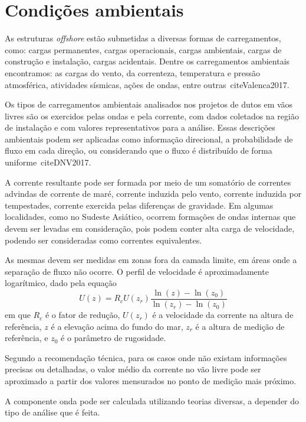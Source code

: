 \section{Condições ambientais}
\label{sec:condicoes-ambientais}

As estruturas \textit{offshore} estão submetidas a diversas formas de carregamentos, como: cargas permanentes, cargas operacionais, cargas ambientais, cargas de construção e instalação, cargas acidentais.
Dentre os carregamentos ambientais encontramos: as cargas do vento, da correnteza, temperatura e pressão atmosférica, atividades sísmicas, ações de ondas, entre outras~cite{Valenca2017}.

Os tipos de carregamentos ambientais analisados nos projetos de dutos em vãos livres são os exercidos pelas ondas e pela corrente, com dados coletados na região de instalação e com valores representativos para a análise.
Essas descrições ambientais podem ser aplicadas como informação direcional, a probabilidade de fluxo em cada direção, ou considerando que o fluxo é distribuído de forma uniforme~cite{DNV2017}.

A corrente resultante pode ser formada por meio de um somatório de correntes advindas de corrente de maré, corrente induzida pelo vento, corrente induzida por tempestades, corrente exercida pelas diferenças de gravidade.
Em algumas localidades, como no Sudeste Asiático, ocorrem formações de ondas internas que devem ser levadas em consideração, pois podem conter alta carga de velocidade, podendo ser consideradas como correntes equivalentes.

As mesmas devem ser medidas em zonas fora da camada limite, em áreas onde a separação de fluxo não ocorre.
O perfil de velocidade é aproximadamente logarítmico, dado pela equação
\begin{equation}
\label{eq:jdsn-eq1}
U(z) = R_c U(z_r) \frac{\ln{(z)}- \ln(z_0)}{\ln (z_r)- \ln (z_0)}
\end{equation}
em que $R_c$ é o fator de redução, $U(z_r)$ é a velocidade da corrente na altura de referência, $z$ é a elevação acima do fundo do mar, $z_r$ é a altura de medição de referência, e $z_0$ é o parâmetro de rugosidade.

Segundo a recomendação técnica, para os casos onde não existam informações precisas ou detalhadas, o valor médio da corrente no vão livre pode ser aproximado a partir dos valores mensurados no ponto de medição mais próximo.

A componente onda pode ser calculada utilizando teorias diversas, a depender do tipo de análise que é feita.

